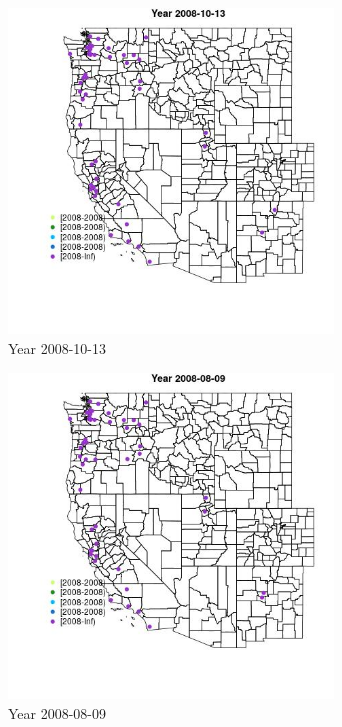 \begin{figure} 
\centering  
\includegraphics[width=0.77\textwidth]{Code_Outputs/Report_ML_input_PM25_Step4_part_e_de_duplicated_aves_MapObsYear2008-10-13.jpg} 
\caption{\label{fig:Report_ML_input_PM25_Step4_part_e_de_duplicated_avesMapObsYear2008-10-13}Year 2008-10-13} 
\end{figure} 
 

\begin{figure} 
\centering  
\includegraphics[width=0.77\textwidth]{Code_Outputs/Report_ML_input_PM25_Step4_part_e_de_duplicated_aves_MapObsYear2008-08-09.jpg} 
\caption{\label{fig:Report_ML_input_PM25_Step4_part_e_de_duplicated_avesMapObsYear2008-08-09}Year 2008-08-09} 
\end{figure} 
 

